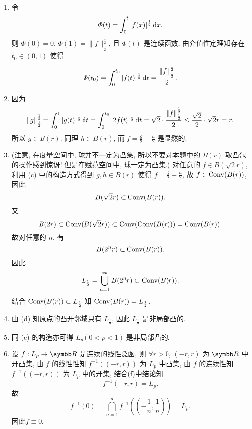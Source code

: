 \begin{enumerate}
\begin{answer}
\begin{enumerate}
        \item 令
        \[\varPhi(t)=\int_0^t|f(x)|^{\frac{1}{2}}\mathop{}\!\mathrm{d} x.\]
        则 $\varPhi(0)=0$, $\varPhi(1)=\|f\|_{\frac{1}{2}}^{\frac{1}{2}}$,
        且 $\varPhi(t)$ 是连续函数, 由介值性定理知存在 $t_0\in(0,1)$ 使得
        \[\varPhi(t_0)=\int_0^{t_0}|f(t)|^{\frac{1}{2}}\mathop{}\!\mathrm{d} t=\frac{\|f\|_{\frac{1}{2}}^{\frac{1}{2}}}{2}.\]
    
        \item 因为
        \[\|g\|_{\frac{1}{2}}^{\frac{1}{2}}=\int_0^1|g(t)|^{\frac{1}{2}}\mathop{}\!\mathrm{d} t=\int_0^{t_0}|2f(t)|^{\frac{1}{2}}\mathop{}\!\mathrm{d} t=\sqrt{2}\cdot\frac{\|f\|_{\frac{1}{2}}^{\frac{1}{2}}}{2}\leq\frac{\sqrt{2}}{2}\cdot\sqrt{2}r=r.\]
        所以 $g\in B(r)$. 同理 $h\in B(r)$, 而 $f=\frac{g}{2}+\frac{h}{2}$ 是显然的.
    
        \item (注意, 在度量空间中, 球并不一定为凸集, 所以不要对本题中的 $B(r)$ 取凸包的操作感到惊讶! 但是在赋范空间中, 球一定为凸集.)
        对任意的 $f\in B(\sqrt{2}r)$, 利用 (c) 中的构造方式得到 $g,h\in B(r)$ 使得 $f=\frac{g}{2}+\frac{h}{2}$,
        故 $f\in \operatorname{Conv}(B(r))$, 因此
        \[B(\sqrt{2}r)\subset \operatorname{Conv}(B(r)).\]
        又
        \[B(2r)\subset \operatorname{Conv}(B(\sqrt{2}r))\subset \operatorname{Conv}(\operatorname{Conv}(B(r)))=\operatorname{Conv}(B(r)).\]
        故对任意的 $n$, 有
        \[B(2^nr)\subset \operatorname{Conv}(B(r)).\]
        因此
        \[L_{\frac{1}{2}}=\bigcup_{n=1}^{\infty} B(2^nr)\subset \operatorname{Conv}(B(r)).\]
        结合 $\operatorname{Conv}(B(r))\subset L_{\frac{1}{2}}$ 知 $\operatorname{Conv}(B(r))=L_{\frac{1}{2}}$.
    
        \item 由 (d) 知原点的凸开邻域只有 $L_{\frac{1}{2}}$, 因此 $L_{\frac{1}{2}}$ 是非局部凸的.
    
        \item 同 (c) 的构造亦可得 $L_p(0<p<1)$ 是非局部凸的.
    
        \item 设 $f:L_p\to\R$ 是连续的线性泛函,
        则 $\forall r>0$, $(-r,r)$ 为 $\R$ 中开凸集,
        由 $f$ 的线性性知 $f^{-1}((-r,r))$ 为 $L_p$ 中凸集, 
        由 $f$ 的连续性知 $f^{-1}((-r,r))$ 为 $L_p$ 中的开集, 结合(f)中结论知
        \[f^{-1}(-r,r)=L_p.\]
        故
        \[f^{-1}(0)=\bigcap_{n=1}^{\infty}f^{-1}\left(\left(-\frac{1}{n},\frac{1}{n}\right)\right)=L_p.\]
        因此$f\equiv 0$.
      \end{enumerate}
    \end{answer}
\end{enumerate}


